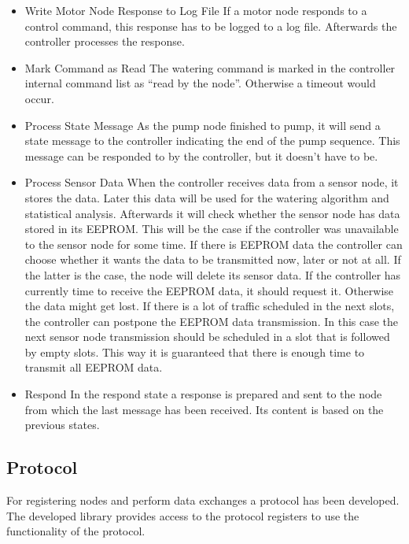 \documentclass[12pt,a4paper,titlepage,oneside]{article}
\begin{document}
\begin{itemize}
	\item Write Motor Node Response to Log File
		If a motor node responds to a control command, this response has to be logged to a log file. Afterwards the controller processes the response.
	\item Mark Command as Read
		The watering command is marked in the controller internal command list as ``read by the node''. Otherwise a timeout would occur.
		
	\item Process State Message
		As the pump node finished to pump, it will send a state message to the controller indicating the end of the pump sequence. This message can be responded to by the controller, but it doesn't have to be.
		
	\item Process Sensor Data
		When the controller receives data from a sensor node, it stores the data. Later this data will be used for the watering algorithm and statistical analysis. Afterwards it will check whether the sensor node has data stored in its EEPROM. This will be the case if the controller was unavailable to the sensor node for some time. If there is EEPROM data the controller can choose whether it wants the data to be transmitted now, later or not at all. If the latter is the case, the node will delete its sensor data. If the controller has currently time to receive the EEPROM data, it should request it. Otherwise the data might get lost. If there is a lot of traffic scheduled in the next slots, the controller can postpone the EEPROM data transmission. In this case the next sensor node transmission should be scheduled in a slot that is followed by empty slots. This way it is guaranteed that there is enough time to transmit all EEPROM data.
	
	\item Respond
		In the respond state a response is prepared and sent to the node from which the last message has been received. Its content is based on the previous states.
		
	
	
\end{itemize}


\subsection{Protocol}
For registering nodes and perform data exchanges a protocol has been developed. The developed library provides access to the protocol registers to use the functionality of the protocol.
\end{document}
